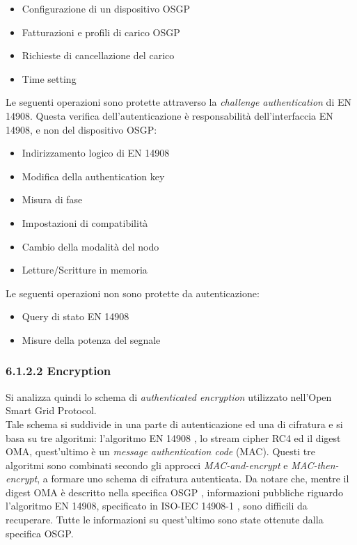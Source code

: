 \begin{itemize}
	\item Configurazione di un dispositivo OSGP
	\item Fatturazioni e profili di carico OSGP
	\item Richieste di cancellazione del carico
	\item Time setting
\end{itemize}
Le seguenti operazioni sono protette attraverso la \textit{challenge authentication} di EN 14908. Questa verifica dell'autenticazione è responsabilità dell'interfaccia EN 14908, e non del dispositivo OSGP:
\begin{itemize}
	\item Indirizzamento logico di EN 14908
	\item Modifica della authentication key
	\item Misura di fase
	\item Impostazioni di compatibilità
	\item Cambio della modalità del nodo
	\item Letture/Scritture in memoria
\end{itemize}
Le seguenti operazioni non sono protette da autenticazione:
\begin{itemize}
	\item Query di stato EN 14908
	\item Misure della potenza del segnale
\end{itemize}
\subsubsection{6.1.2.2 Encryption}
Si analizza quindi lo schema di \emph{authenticated encryption} utilizzato nell'Open Smart Grid Protocol.\\
Tale schema si suddivide in una parte di autenticazione ed una di cifratura e si basa su tre algoritmi: l'algoritmo EN 14908 \cite{standard14908}, lo stream cipher RC4 ed il digest OMA, quest'ultimo è un \emph{message authentication code} (MAC). Questi tre algoritmi sono combinati secondo gli approcci \textit{MAC-and-encrypt} e \textit{MAC-then-encrypt}, a formare uno schema di cifratura autenticata. Da notare che, mentre il digest OMA è descritto nella specifica OSGP \cite{osgp}, informazioni pubbliche riguardo l'algoritmo EN 14908, specificato in ISO-IEC 14908-1 \cite{standard14908}, sono difficili da recuperare. Tutte le informazioni su quest'ultimo sono state ottenute dalla specifica OSGP.\\
